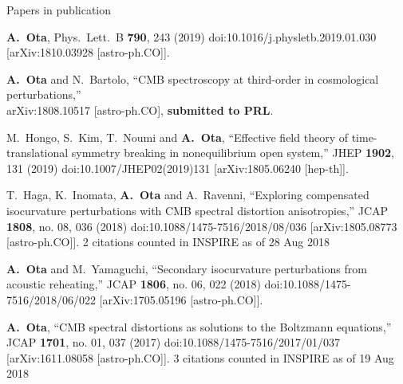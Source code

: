 \documentclass[a4paper]{resume} %
\begin{document}
\begin{rSection}{Papers in publication}


\begin{etaremune}

\item  
  {\bf A.~Ota},
  Phys.\ Lett.\ B {\bf 790}, 243 (2019)
  doi:10.1016/j.physletb.2019.01.030
  [arXiv:1810.03928 [astro-ph.CO]].
  

\item
  {\bf A.~Ota} and N.~Bartolo,
  ``CMB spectroscopy at third-order in cosmological perturbations,''\\
  arXiv:1808.10517 [astro-ph.CO], {\bf submitted to PRL}.
    \item 
      M.~Hongo, S.~Kim, T.~Noumi and {\bf A.~Ota},
  ``Effective field theory of time-translational symmetry breaking in nonequilibrium open system,''
  JHEP {\bf 1902}, 131 (2019)
  doi:10.1007/JHEP02(2019)131
  [arXiv:1805.06240 [hep-th]].



\item
  T.~Haga, K.~Inomata, {\bf A.~Ota} and A.~Ravenni,
  ``Exploring compensated isocurvature perturbations with CMB spectral distortion anisotropies,''
  JCAP {\bf 1808}, no. 08, 036 (2018)
  doi:10.1088/1475-7516/2018/08/036
  [arXiv:1805.08773 [astro-ph.CO]].
  2 citations counted in INSPIRE as of 28 Aug 2018
  
    \item 
  {\bf A.~Ota} and M.~Yamaguchi,
  ``Secondary isocurvature perturbations from acoustic reheating,''
  JCAP {\bf 1806}, no. 06, 022 (2018)
  doi:10.1088/1475-7516/2018/06/022
  [arXiv:1705.05196 [astro-ph.CO]].
  
    \item
  {\bf A.~Ota},
  ``CMB spectral distortions as solutions to the Boltzmann equations,''
  JCAP {\bf 1701}, no. 01, 037 (2017)
  doi:10.1088/1475-7516/2017/01/037
  [arXiv:1611.08058 [astro-ph.CO]].
  3 citations counted in INSPIRE as of 19 Aug 2018
  

\end{etaremune}
\end{rSection}
\end{document}
